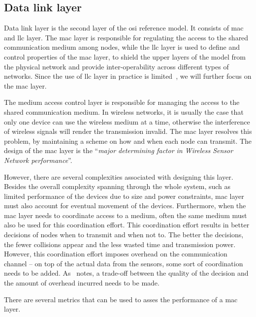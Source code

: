 \subsection{Data link layer}
Data link layer is the second layer of the \acrshort{osi} reference model. It consists of \acrfull{mac} and \acrfull{llc} layer. The \acrshort{mac} layer is responsible for regulating the access to the shared communication medium among nodes, while the \acrshort{llc} layer is used to define and control properties of the \acrshort{mac} layer, to shield the upper layers of the model from the physical network and provide inter-operability  across different types of networks. Since the use of \acrshort{llc} layer in practice is limited~\cite{Sohraby2007WirelessApplications}, we will further focus on the \acrshort{mac} layer.

The medium access control layer is responsible for managing the access to the shared communication medium. In wireless networks, it is usually the case that only one device can use the wireless medium at a time, otherwise the interference of wireless signals will render the transmission invalid. The \acrshort{mac} layer resolves this problem, by maintaining a scheme on how and when each node can transmit. The design of the \acrshort{mac} layer is the ``\textit{major determining factor in Wireless Sensor Network performance}''\cite{Sohraby2007WirelessApplications}. 

However, there are several complexities associated with designing this layer. Besides the overall complexity spanning through the whole system, such as limited performance of the devices due to size and power constraints, \acrshort{mac} layer must also account for eventual movement of the devices. Furthermore, when the \acrshort{mac} layer needs to coordinate access to a medium, often the same medium must also be used for this coordination effort. This coordination effort results in better decisions of nodes when to transmit and when not to. The better the decisions, the fewer collisions appear and the less wasted time and transmission power. However, this coordination effort imposes overhead on the communication channel -- on top of the actual data from the sensors, some sort of coordination needs to be added. As~\cite{Sohraby2007WirelessApplications} notes, a trade-off between the quality of the decision and the amount of overhead incurred needs to be made.

There are several metrics that can be used to asses the performance of a \acrshort{mac} layer. 

